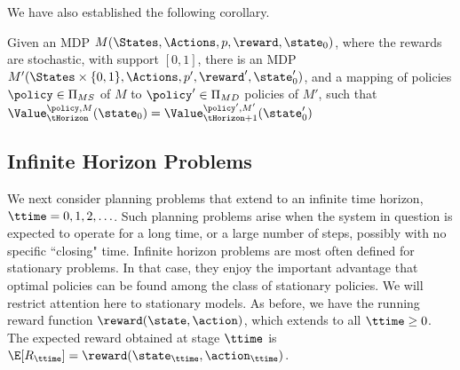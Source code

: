 We have also established the following corollary.

\begin{corollary}
Given an MDP $M(\States,\Actions,p,\reward,\state_0)$, where the
rewards are stochastic, with support $[0,1]$, there is an MDP
$M'(\States\times \{ 0,1\},\Actions,p',\reward',\state'_0)$, and a
mapping of policies $\policy\in \Pi_{MS}$ of $M$ to $\policy'\in
\Pi_{MD}$ policies of $M'$, such that
$\Value_\tHorizon^{\policy,M}(\state_0)=\Value_{\tHorizon+1}^{\policy',M'}(\state'_0)$
\end{corollary}

%
%



\subsection{Infinite Horizon Problems}
We next consider planning problems that extend to an infinite time
horizon, $\ttime = 0,1,2, \ldots $. Such planning problems arise
when the system in question is expected to operate for a long time,
or a large number of steps, possibly with no specific ``closing"
time. Infinite horizon problems are most often defined for
stationary problems. In that case, they enjoy the important
advantage that optimal policies can be found among the class of
stationary policies.  We will restrict attention here to stationary
models. As before, we have the running reward function
$\reward(\state,\action)$, which extends to all $\ttime\ge 0$. The
expected reward obtained at stage $\ttime$ is $\E[{R_\ttime}] =
\reward({\state_\ttime},{\action_\ttime})$.

